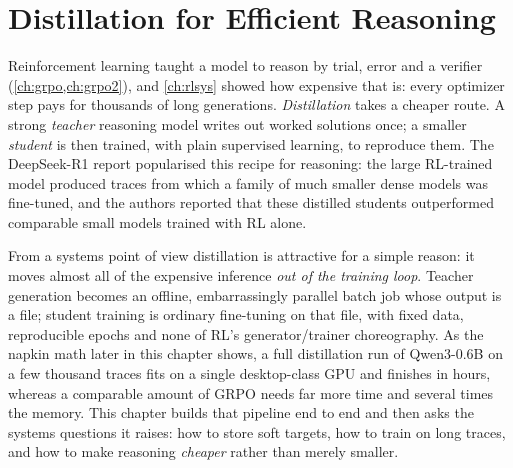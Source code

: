 \chapter{Distillation for Efficient Reasoning}\label{ch:distill}

Reinforcement learning taught a model to reason by trial, error and a verifier
(\cref{ch:grpo,ch:grpo2}), and \cref{ch:rlsys} showed how expensive that is: every optimizer
step pays for thousands of long generations. \emph{Distillation} takes a cheaper route. A
strong \emph{teacher} reasoning model writes out worked solutions once; a smaller
\emph{student} is then trained, with plain supervised learning, to reproduce them. The
DeepSeek-R1 report popularised this recipe for reasoning: the large RL-trained model produced
traces from which a family of much smaller dense models was fine-tuned, and the authors
reported that these distilled students outperformed comparable small models trained with RL
alone.

From a systems point of view distillation is attractive for a simple reason: it moves almost
all of the expensive inference \emph{out of the training loop}. Teacher generation becomes an
offline, embarrassingly parallel batch job whose output is a file; student training is ordinary
fine-tuning on that file, with fixed data, reproducible epochs and none of RL's
generator/trainer choreography. As the napkin math later in this chapter shows, a full distillation run of
Qwen3-0.6B on a few thousand traces fits on a single desktop-class GPU and finishes in hours,
whereas a comparable amount of GRPO needs far more time and several times the memory. This chapter builds that pipeline end to end and then asks the systems
questions it raises: how to store soft targets, how to train on long traces, and how to make
reasoning \emph{cheaper} rather than merely smaller.

